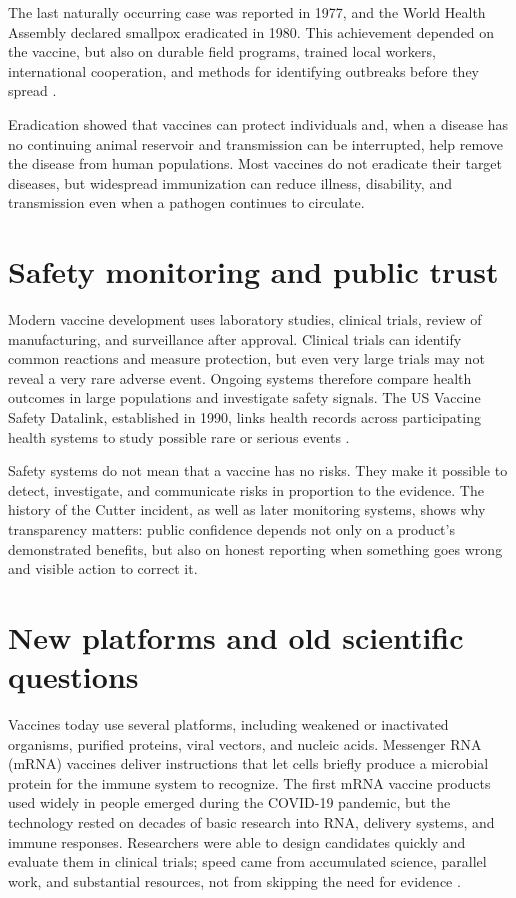 \documentclass[12pt,oneside]{book}
\begin{document}
The last naturally occurring case was reported in 1977, and the World Health
Assembly declared smallpox eradicated in 1980. This achievement depended on
the vaccine, but also on durable field programs, trained local workers,
international cooperation, and methods for identifying outbreaks before they
spread \cite{whoSmallpox}.

Eradication showed that vaccines can protect individuals and, when a disease
has no continuing animal reservoir and transmission can be interrupted, help
remove the disease from human populations. Most vaccines do not eradicate
their target diseases, but widespread immunization can reduce illness,
disability, and transmission even when a pathogen continues to circulate.

\section{Safety monitoring and public trust}
Modern vaccine development uses laboratory studies, clinical trials, review
of manufacturing, and surveillance after approval. Clinical trials can
identify common reactions and measure protection, but even very large trials
may not reveal a very rare adverse event. Ongoing systems therefore compare
health outcomes in large populations and investigate safety signals. The US
Vaccine Safety Datalink, established in 1990, links health records across
participating health systems to study possible rare or serious events
\cite{cdcVSD}.

Safety systems do not mean that a vaccine has no risks. They make it possible
to detect, investigate, and communicate risks in proportion to the evidence.
The history of the Cutter incident, as well as later monitoring systems,
shows why transparency matters: public confidence depends not only on a
product's demonstrated benefits, but also on honest reporting when something
goes wrong and visible action to correct it.

\section{New platforms and old scientific questions}
Vaccines today use several platforms, including weakened or inactivated
organisms, purified proteins, viral vectors, and nucleic acids. Messenger RNA
(mRNA) vaccines deliver instructions that let cells briefly produce a
microbial protein for the immune system to recognize. The first mRNA vaccine
products used widely in people emerged during the COVID-19 pandemic, but the
technology rested on decades of basic research into RNA, delivery systems, and
immune responses. Researchers were able to design candidates quickly and
evaluate them in clinical trials; speed came from accumulated science,
parallel work, and substantial resources, not from skipping the need for
evidence \cite{whoMRNA}.
\end{document}
